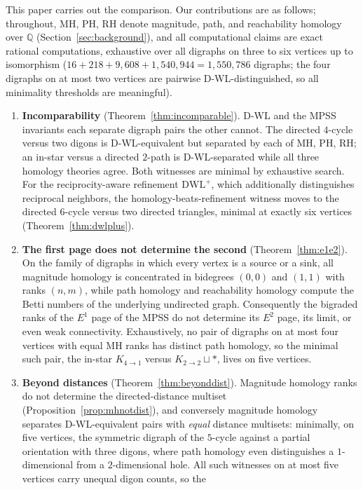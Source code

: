 \documentclass[pdflatex,sn-mathphys,Numbered]{sn-jnl}
\theoremstyle{thmstyleone}
\theoremstyle{thmstyletwo}
\newcommand{\MH}{\mathrm{MH}}
\newcommand{\PH}{\mathrm{PH}}
\newcommand{\RH}{\mathrm{RH}}
\newcommand{\QQ}{\mathbb{Q}}
\newcommand{\dwlp}{\mathrm{DWL}^{+}}
\begin{document}
This paper carries out the comparison. Our contributions are as follows;
throughout, $\MH$, $\PH$, $\RH$ denote magnitude, path, and reachability
homology over $\QQ$ (Section~\ref{sec:background}), and all computational
claims are exact rational computations, exhaustive over all digraphs on
three to six vertices up to isomorphism
($16 + 218 + 9{,}608 + 1{,}540{,}944 = 1{,}550{,}786$ digraphs; the four
digraphs on at most two vertices are pairwise D-WL-distinguished, so all
minimality thresholds are meaningful).

\begin{enumerate}
\item \textbf{Incomparability} (Theorem~\ref{thm:incomparable}). D-WL and
the MPSS invariants each separate digraph pairs the other cannot. The
directed $4$-cycle versus two digons is D-WL-equivalent but separated by
each of $\MH$, $\PH$, $\RH$; an in-star versus a directed $2$-path is
D-WL-separated while all three homology theories agree. Both witnesses are
minimal by exhaustive search. For the reciprocity-aware refinement
$\dwlp$, which additionally distinguishes reciprocal neighbors, the
homology-beats-refinement witness moves to the directed $6$-cycle versus
two directed triangles, minimal at exactly six vertices
(Theorem~\ref{thm:dwlplus}).
\item \textbf{The first page does not determine the second}
(Theorem~\ref{thm:e1e2}). On the family of digraphs in which every vertex
is a source or a sink, all magnitude homology is concentrated in bidegrees
$(0,0)$ and $(1,1)$ with ranks $(n, m)$, while path homology and
reachability homology compute the Betti numbers of the underlying
undirected graph. Consequently the bigraded ranks of the $E^1$ page of the
MPSS do not determine its $E^2$ page, its limit, or even weak
connectivity. Exhaustively, no pair of digraphs on at most four vertices
with equal $\MH$ ranks has distinct path homology, so the minimal such
pair, the in-star $K_{4\to 1}$ versus $K_{2\to 2}\sqcup\ast$, lives on
five vertices.
\item \textbf{Beyond distances} (Theorem~\ref{thm:beyonddist}). Magnitude
homology ranks do not determine the directed-distance multiset
(Proposition~\ref{prop:mhnotdist}), and conversely magnitude homology
separates D-WL-equivalent pairs with \emph{equal} distance multisets:
minimally, on five vertices, the symmetric digraph of the $5$-cycle
against a partial orientation with three digons, where path homology even
distinguishes a $1$-dimensional from a $2$-dimensional hole. All such
witnesses on at most five vertices carry unequal digon counts, so the

\end{enumerate}
\end{document}
